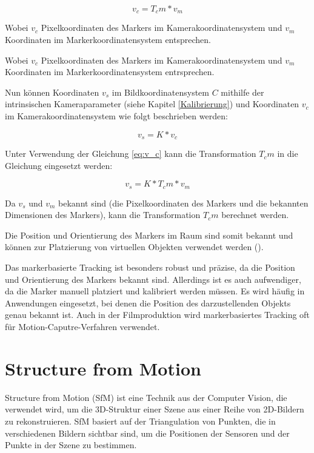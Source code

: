 \begin{equation}\label{eq:v_c}
v_c = T_cm * v_m
\end{equation}

Wobei \( v_c \) Pixelkoordinaten des Markers im Kamerakoordinatensystem und \( v_m \) Koordinaten im Markerkoordinatensystem entsprechen.

Wobei \( v_c \) Pixelkoordinaten des Markers im Kamerakoordinatensystem und \( v_m \) Koordinaten im Markerkoordinatensystem entrsprechen.

Nun können Koordinaten \( v_s \) im Bildkoordinatensystem \( C \) mithilfe der intrinsischen Kameraparameter (siehe Kapitel \ref{Kalibrierung}) und Koordinaten \( v_c \) im Kamerakoordinatensystem wie folgt beschrieben werden:

\[ v_s = K * v_c \]

Unter Verwendung der Gleichung \ref{eq:v_c} kann die Transformation \( T_cm \) in die Gleichung eingesetzt werden:

\[ v_s = K * T_cm * v_m \]

Da \(v_s\) und \(v_m\) bekannt sind (die Pixelkoordinaten des Markers und die bekannten Dimensionen des Markers), kann die Transformation \(T_cm\) berechnet werden.

Die Position und Orientierung des Markers im Raum sind somit bekannt und können zur Platzierung von virtuellen Objekten verwendet werden (\cite{doerner2022virtual}).

Das markerbasierte Tracking ist besonders robust und präzise, da die Position und Orientierung des Markers bekannt sind. Allerdings ist es auch aufwendiger, da die Marker manuell platziert und kalibriert werden müssen. Es wird häufig in Anwendungen eingesetzt, bei denen die Position des darzustellenden Objekts genau bekannt ist. Auch in der Filmproduktion wird markerbasiertes Tracking oft für Motion-Caputre-Verfahren verwendet.

\section{Structure from Motion}\label{SfM}

Structure from Motion (SfM) ist eine Technik aus der Computer Vision, die verwendet wird, um die 3D-Struktur einer Szene aus einer Reihe von 2D-Bildern zu rekonstruieren. SfM basiert auf der Triangulation von Punkten, die in verschiedenen Bildern sichtbar sind, um die Positionen der Sensoren und der Punkte in der Szene zu bestimmen.

